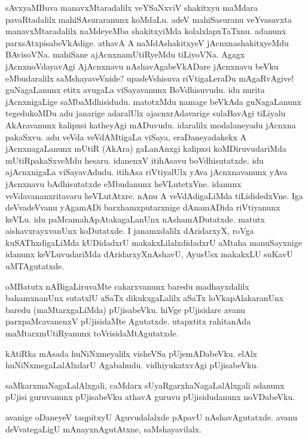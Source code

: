 \begin{mng}
sAvxyaMBuva manavxMtaradalilx veYSaNxviV shakitxyu maMdara pavaRtadalilx mahiSAsuraranunx koMdaLu. adeV mahiSasuranu veYvasavxta manavxMtaradalilx naMdeyeMba shakitxyiMda kolalxlapxTaTxnu. adanunx parxsAtxpisabeVkAdige. athavA A naMdAshakitxyeV jAcnxnashakitxyeMdu BAvisoVNa. mahiSane ajAcnxnamUtiRyeMdu tiLiyoVNa. Agagx jAcnxnoVdayavAgi AjAcnxnavu nAshavAgabeVkADare jAcnxnavu beVku eMbudaralilx saMshayaveVnide? upadeVshisuva riVtigaLeraDu mAgaRvAgive! guNagaLanunx etitx avugaLa viSayavanunx BoVdhisuvudu. idu nurita jAcnxnigaLige saMbaMdhisidudu. matotxMdu namage beVkAda guNagaLanunx tegedukoMDu adu janarige adaralUlx ajacnxrAdavarige sulaBavAgi tiLiyalu AkAravanunx kalipxsi katheyAgi mADuvudu. idaralilx modalaneyadu jAcnxna pakaSxvu. adu veVda veVdAMtigaLa viSaya, eraDaneyadakekx A jAcnxnagaLanunx mUtiR (AkAra) gaLanAnxgi kalipxsi koMDiruvudariMda mUtiRpakaSxveMdu hesaru. idanenxV itihAsavu boVdhisutatxde. idu ajAcnxnigaLa viSayavAdudu. itihAsa riVtiyalUlx yAva jAcnxnavanunx yAva jAcnxnavu bAdhisutatxde eMbudanunx heVLutetxVne. idanunx veVdavananxritavaru heVLutAtxre. nAnu A veVdAdigaLiMda tiLididedxVne. Iga deVvadeVvanu yAgamADi barxhamxputarxnige dAnamADida riVtiyanunx keVLu. idu paMcamahApAtakagaLanUnx nAshamADutatxde. matutx aishavxrayxvanUnx koDutatxde. I janamxdalilx dAridarxyX, roVga kuSAThxdigaLiMda kUDidadxrU makakxLilalxdidadxrU aMtaha manuSayxnige idanunx keVLuvudariMda dAridarxyXnAshavU, AyusUsx makakxLU suKavU uMTAgutatxde.
\end{mng}

\begin{mng}
oMBatutx nABigaLiruvaMte cakarxvanunx baredu madhayxdalilx bahamxnanUnx sutatxlU aSaTx dikukxgaLalilx aSaTx loVkapAlakaranUnx baredu (maMtarxgaLiMda) pUjisabeVku. hiVge pUjisidare avanu parxpaMcavanenxV pUjisidaMte Agutatxde. utapxtitx rahitanAda maMtarxmUtiRyanunx toVrisidaMtAgutatxde.
\end{mng}

\begin{mng}
kAtiRka mAsada huNiNxmeyalilx visheVSa pUjemADabeVku. elAlx huNiNxmegaLalAlxdarU Agabahudu. vidhiyukatxvAgi pUjisabeVku.
\end{mng}

\begin{mng}
saMkarxmaNagaLalAlxgali, caMdarx sUyaRgarxhaNagaLalAlxgali adanunx pUjisi guruvanunx pUjisabeVku athavA guruvu pUjisidudanunx noVDabeVku.
\end{mng}

\begin{mng}
avanige oDaneyeV taqpitxyU Aguvudalalxde pApavU nAshavAgutatxde. avanu deVvategaLigU mAnayxnAgutAtxne, saMshayavilalx.
\end{mng}


